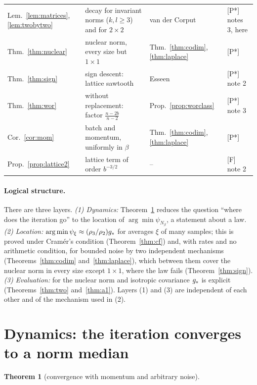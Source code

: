 \documentclass[10pt]{article}
\newtheorem{theorem}{Theorem}
\theoremstyle{definition}
\theoremstyle{remark}
\newcommand{\status}[1]{\textsf{\small[#1]}}
\begin{document}
{\begin{longtable}{@{}p{}p{}p{}p{}@{}}
Lem.~\ref{lem:matrices}, \ref{lem:twobytwo} & decay for invariant norms ($k,l\ge3$) and for $2\times2$ & van der Corput \citep{stein} & \status{P*} notes 3, here\\
Thm.~\ref{thm:nuclear} & nuclear norm, every size but $1\times1$ & Thm.~\ref{thm:codim}, \ref{thm:laplace} & \status{P*}\\
Thm.~\ref{thm:sign} & sign descent: lattice sawtooth & Esseen \citep{esseen,gk} & \status{P*} note 2\\
Thm.~\ref{thm:wor} & without replacement: factor $\frac{n-2b}{n-2}$ & Prop.~\ref{prop:worclass} & \status{P*} note 3\\
Cor.~\ref{cor:mom} & batch and momentum, uniformly in $\beta$ & Thm.~\ref{thm:codim}, \ref{thm:laplace} & \status{P*}\\
Prop.~\ref{prop:lattice2} & lattice term of order $b^{-3/2}$ & -- & \status{F} note 2\\
\bottomrule
\end{longtable}}

\paragraph{Logical structure.} There are three layers. \emph{(1) Dynamics:} Theorem~\ref{thm:conv} reduces the question
``where does the iteration go'' to the location of $\arg\min\psi_{N_\beta}$, a statement about a law. \emph{(2) Location:}
$\arg\min\psi_{\xi}\approx(\rho_3/\rho_2)g_\ast$ for averages $\xi$ of many samples; this is proved under Cram\'er's
condition (Theorem~\ref{thm:cf}) and, with rates and no arithmetic condition, for bounded noise by two independent
mechanisms (Theorems~\ref{thm:codim} and~\ref{thm:laplace}), which between them cover the nuclear norm in every size
except $1\times1$, where the law fails (Theorem~\ref{thm:sign}). \emph{(3) Evaluation:} for the nuclear norm and isotropic
covariance $g_\ast$ is explicit (Theorems~\ref{thm:two} and~\ref{thm:a1}). Layers (1) and (3) are independent of each other
and of the mechanism used in (2).

\section{Dynamics: the iteration converges to a norm median}\label{sec:dyn}

\begin{theorem}[convergence with momentum and arbitrary noise]\label{thm:conv}\StmtConv\end{theorem}

\end{document}
